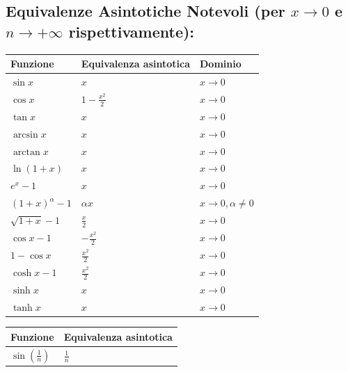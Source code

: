 \documentclass[10pt, a4paper]{article}
\begin{document}
    \subsection{Equivalenze Asintotiche Notevoli (per $x \to 0$ e $n \to +\infty$ rispettivamente):}
        \begin{center}
            \begin{tabular}{|lll|}
                \hline
                \textbf{Funzione} & \textbf{Equivalenza asintotica} & \textbf{Dominio}\\
                \hline
                $\sin x$ & $x$ & $x \to 0$ \\
                \hline
                $\cos x$ & $1-\frac{x^2}{2}$ & $x \to 0$ \\
                \hline
                $\tan x$ & $x$ & $x \to 0$ \\
                \hline
                $\arcsin x$ & $x$ & $x \to 0$ \\
                \hline
                $\arctan x$ & $x$ & $x \to 0$ \\
                \hline
                $\ln(1+x)$ & $x$ & $x \to 0$ \\
                \hline
                $e^x - 1$ & $x$ & $x \to 0$ \\
                \hline
                $(1+x)^\alpha - 1$ & $\alpha x$ & $x \to 0, \alpha \neq 0$ \\
                \hline
                $\sqrt{1+x} - 1$ & $\frac{x}{2}$ & $x \to 0$ \\
                \hline
                $\cos x - 1$ & $-\frac{x^2}{2}$ & $x \to 0$ \\
                \hline
                $1 - \cos x$ & $\frac{x^2}{2}$ & $x \to 0$ \\
                \hline
                $\cosh x - 1$ & $\frac{x^2}{2}$ & $x \to 0$ \\
                \hline
                $\sinh x$ & $x$ & $x \to 0$ \\
                \hline
                $\tanh x$ & $x$ & $x \to 0$ \\
                \hline
            \end{tabular}
            \begin{tabular}{|ll|}
                \hline
                \textbf{Funzione} & \textbf{Equivalenza asintotica} \\
                \hline
                $\displaystyle\sin\left(\frac{1}{n}\right)$ & $\displaystyle\frac{1}{n}$ \\

\end{tabular}
\end{center}
\end{document}
